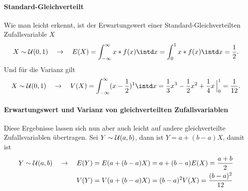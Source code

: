 \paragraph{Standard-Gleichverteilt}
Wie man leicht erkennt, ist der Erwartungswert einer Standard-Gleichverteilten Zufallsvariable $X$
\begin{equation*}
	X\sim\uniform(0,1) \quad \rightarrow \quad E(X)=\int_{-\infty}^\infty x*f(x)\intd x=\int_{0}^1 x*f(x)\intd x=\frac 12.
\end{equation*}
Und für die Varianz gilt
\begin{equation*}
	X\sim\uniform(0,1) \quad \rightarrow \quad V(X)=\int_{-\infty}^\infty (x-\frac12)^1\intd x=\frac13 x^3-\frac12x^2+\frac14 x\,\Big|_0^1=\frac1{12}.
\end{equation*}
\paragraph{Erwartungswert und Varianz von gleichverteilten Zufallsvariablen}
Diese Ergebnisse lassen sich nun aber auch leicht auf andere gleichverteilte Zufallsvariablen übertragen.
Sei $Y\sim\mathcal{U}(a,b)$, dann ist $Y=a+(b-a)X$, damit ist
\begin{align*}
	Y\sim\mathcal{U}(a,b)\quad\rightarrow\quad E(Y)&=E(a+(b-a)X)=a+(b-a)E(X)=\frac{a+b}{2}\\
	V(Y)&=V(a+(b-a)X)=(b-a)^2V(X)=\frac{(b-a)^2}{12}
\end{align*}
